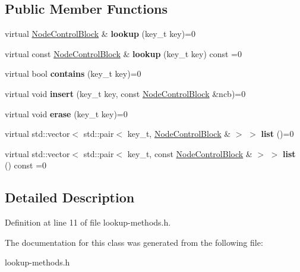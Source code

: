 \subsection*{Public Member Functions}
\begin{DoxyCompactItemize}
\item 
\mbox{\label{class_hash_octree_1_1_lookup_method_a58a239f1c1ce4da578230e364d5c4657}} 
virtual \mbox{\hyperlink{class_hash_octree_1_1_node_control_block}{Node\+Control\+Block}} \& {\bfseries lookup} (key\+\_\+t key)=0
\item 
\mbox{\label{class_hash_octree_1_1_lookup_method_a5d64b539b3f099248706b5cd8ad0ef2a}} 
virtual const \mbox{\hyperlink{class_hash_octree_1_1_node_control_block}{Node\+Control\+Block}} \& {\bfseries lookup} (key\+\_\+t key) const =0
\item 
\mbox{\label{class_hash_octree_1_1_lookup_method_adcf3e2deab4804f5141361895a0ccf0a}} 
virtual bool {\bfseries contains} (key\+\_\+t key)=0
\item 
\mbox{\label{class_hash_octree_1_1_lookup_method_a955f05c8d0b805800d8a219729c11d5e}} 
virtual void {\bfseries insert} (key\+\_\+t key, const \mbox{\hyperlink{class_hash_octree_1_1_node_control_block}{Node\+Control\+Block}} \&ncb)=0
\item 
\mbox{\label{class_hash_octree_1_1_lookup_method_a23e22680e713b8bce7d28140dade2a95}} 
virtual void {\bfseries erase} (key\+\_\+t key)=0
\item 
\mbox{\label{class_hash_octree_1_1_lookup_method_aa0afc2536256ef56a317162a16c361b1}} 
virtual std\+::vector$<$ std\+::pair$<$ key\+\_\+t, \mbox{\hyperlink{class_hash_octree_1_1_node_control_block}{Node\+Control\+Block}} \& $>$ $>$ {\bfseries list} ()=0
\item 
\mbox{\label{class_hash_octree_1_1_lookup_method_a88d11f75aa4310412670e386a7fab056}} 
virtual std\+::vector$<$ std\+::pair$<$ key\+\_\+t, const \mbox{\hyperlink{class_hash_octree_1_1_node_control_block}{Node\+Control\+Block}} \& $>$ $>$ {\bfseries list} () const =0
\end{DoxyCompactItemize}


\subsection{Detailed Description}


Definition at line 11 of file lookup-\/methods.\+h.



The documentation for this class was generated from the following file\+:\begin{DoxyCompactItemize}
\item 
lookup-\/methods.\+h\end{DoxyCompactItemize}
